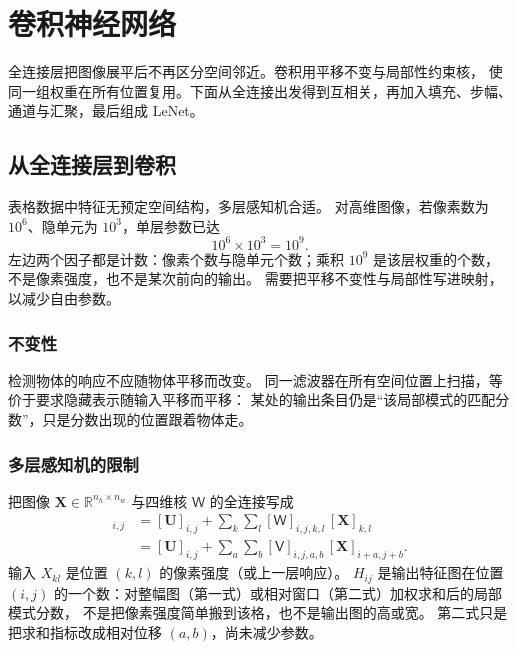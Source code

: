\chapter{卷积神经网络}

全连接层把图像展平后不再区分空间邻近。卷积用平移不变与局部性约束核，
使同一组权重在所有位置复用。下面从全连接出发得到互相关，再加入填充、步幅、通道与汇聚，最后组成 LeNet。

\section{从全连接层到卷积}




表格数据中特征无预定空间结构，多层感知机合适。
对高维图像，若像素数为 $10^{6}$、隐单元为 $10^{3}$，单层参数已达
\[
10^{6}\times 10^{3}=10^{9}.
\]
左边两个因子都是计数：像素个数与隐单元个数；乘积 $10^{9}$ 是该层权重的个数，不是像素强度，也不是某次前向的输出。
需要把平移不变性与局部性写进映射，以减少自由参数。

\subsection{不变性}

检测物体的响应不应随物体平移而改变。
同一滤波器在所有空间位置上扫描，等价于要求隐藏表示随输入平移而平移：
某处的输出条目仍是“该局部模式的匹配分数”，只是分数出现的位置跟着物体走。

\subsection{多层感知机的限制}

把图像 $\bm{X}\in\mathbb{R}^{n_h\times n_w}$ 与四维核 $\mathsf{W}$ 的全连接写成
\begin{align*}
[\bm{H}]_{i,j}
&=
[\bm{U}]_{i,j}
+
\sum_{k}\sum_{l}
[\mathsf{W}]_{i,j,k,l}\,[\bm{X}]_{k,l}\\
&=
[\bm{U}]_{i,j}
+
\sum_{a}\sum_{b}
[\mathsf{V}]_{i,j,a,b}\,[\bm{X}]_{i+a,j+b}.
\end{align*}
输入 $X_{kl}$ 是位置 $(k,l)$ 的像素强度（或上一层响应）。
$H_{ij}$ 是输出特征图在位置 $(i,j)$ 的一个数：对整幅图（第一式）或相对窗口（第二式）加权求和后的局部模式分数，
不是把像素强度简单搬到该格，也不是输出图的高或宽。
第二式只是把求和指标改成相对位移 $(a,b)$，尚未减少参数。

